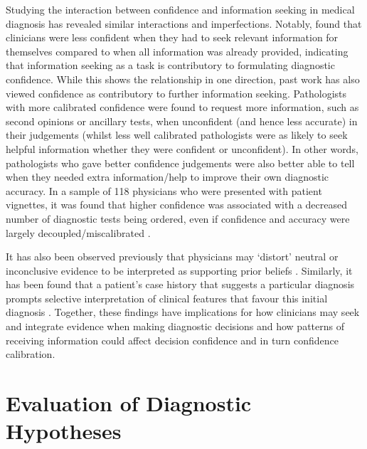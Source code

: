 \documentclass[a4paper, nobind]{templates/ociamthesis}
\begin{document}
Studying the interaction between confidence and information seeking in medical diagnosis has revealed similar interactions and imperfections. Notably, \textcite{gruppen_information_1991} found that clinicians were less confident when they had to seek relevant information for themselves compared to when all information was already provided, indicating that information seeking as a task is contributory to formulating diagnostic confidence. While this shows the relationship in one direction, past work has also viewed confidence as contributory to further information seeking. Pathologists with more calibrated confidence were found to request more information, such as second opinions or ancillary tests, when unconfident (and hence less accurate) in their judgements \autocite{clayton_are_2023} (whilst less well calibrated pathologists were as likely to seek helpful information whether they were confident or unconfident). In other words, pathologists who gave better confidence judgements were also better able to tell when they needed extra information/help to improve their own diagnostic accuracy. In a sample of 118 physicians who were presented with patient vignettes, it was found that higher confidence was associated with a decreased number of diagnostic tests being ordered, even if confidence and accuracy were largely decoupled/miscalibrated \autocite{meyer_physicians_2013}.

\hfill\break
It has also been observed previously that physicians may `distort' neutral or inconclusive evidence to be interpreted as supporting prior beliefs \autocite{kostopoulou_information_2012}. Similarly, it has been found that a patient's case history that suggests a particular diagnosis prompts selective interpretation of clinical features that favour this initial diagnosis \autocite{leblanc_believing_2002}. Together, these findings have implications for how clinicians may seek and integrate evidence when making diagnostic decisions and how patterns of receiving information could affect decision confidence and in turn confidence calibration.

\section{Evaluation of Diagnostic Hypotheses}\label{evaluation-of-diagnostic-hypotheses}
\end{document}
